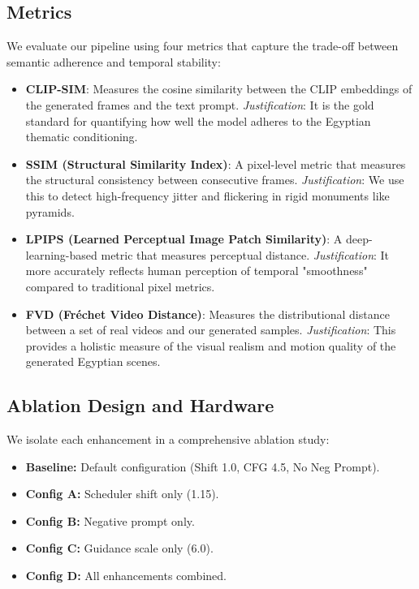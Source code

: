 \documentclass[10pt, conference]{IEEEtran}
\begin{document}
\subsection{Metrics}
We evaluate our pipeline using four metrics that capture the trade-off between semantic adherence and temporal stability:
\begin{itemize}
    \item \textbf{CLIP-SIM}: Measures the cosine similarity between the CLIP embeddings of the generated frames and the text prompt. \textit{Justification}: It is the gold standard for quantifying how well the model adheres to the Egyptian thematic conditioning.
    \item \textbf{SSIM (Structural Similarity Index)}: A pixel-level metric that measures the structural consistency between consecutive frames. \textit{Justification}: We use this to detect high-frequency jitter and flickering in rigid monuments like pyramids.
    \item \textbf{LPIPS (Learned Perceptual Image Patch Similarity)}: A deep-learning-based metric that measures perceptual distance. \textit{Justification}: It more accurately reflects human perception of temporal "smoothness" compared to traditional pixel metrics.
    \item \textbf{FVD (Fréchet Video Distance)}: Measures the distributional distance between a set of real videos and our generated samples. \textit{Justification}: This provides a holistic measure of the visual realism and motion quality of the generated Egyptian scenes.
\end{itemize}

\subsection{Ablation Design and Hardware}
We isolate each enhancement in a comprehensive ablation study:
\begin{itemize}
    \item \textbf{Baseline:} Default configuration (Shift 1.0, CFG 4.5, No Neg Prompt).
    \item \textbf{Config A:} Scheduler shift only (1.15).
    \item \textbf{Config B:} Negative prompt only.
    \item \textbf{Config C:} Guidance scale only (6.0).
    \item \textbf{Config D:} All enhancements combined.
\end{itemize}
\end{document}
